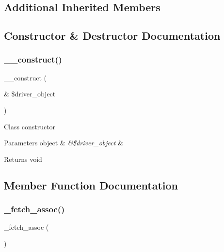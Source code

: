 \subsection*{Additional Inherited Members}


\subsection{Constructor \& Destructor Documentation}
\mbox{\label{class_c_i___d_b__mysql__result_a8e093c8b6e5733bc3f306385ee426ab7}} 
\subsubsection{\texorpdfstring{\+\_\+\+\_\+construct()}{\_\_construct()}}
{\footnotesize\ttfamily \+\_\+\+\_\+construct (\begin{DoxyParamCaption}\item[{\&}]{\$driver\+\_\+object }\end{DoxyParamCaption})}

Class constructor


\begin{DoxyParams}[1]{Parameters}
object & {\em \&\$driver\+\_\+object} & \\
\hline
\end{DoxyParams}
\begin{DoxyReturn}{Returns}
void 
\end{DoxyReturn}


\subsection{Member Function Documentation}
\mbox{\label{class_c_i___d_b__mysql__result_a43a9a92817f1334a1c10752ec44275a0}} 
\subsubsection{\texorpdfstring{\+\_\+fetch\+\_\+assoc()}{\_fetch\_assoc()}}
{\footnotesize\ttfamily \+\_\+fetch\+\_\+assoc (\begin{DoxyParamCaption}{ }\end{DoxyParamCaption})\hspace{0.3cm}{\ttfamily [protected]}}

